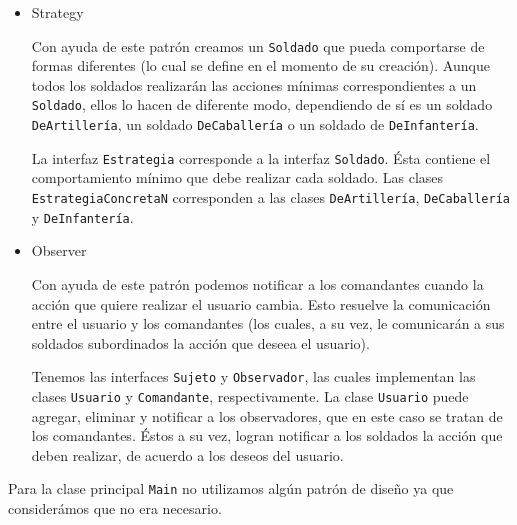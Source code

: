 \documentclass[letterpaper,11pt]{article}
\begin{document}
\begin{enumerate}
\begin{itemize}
        \item Strategy 

        Con ayuda de este patrón creamos un \texttt{Soldado} que pueda 
        comportarse de formas diferentes (lo cual se define en el momento 
        de su creación). Aunque todos los soldados realizarán las acciones 
        mínimas correspondientes a un \texttt{Soldado}, ellos lo hacen de 
        diferente modo, dependiendo de sí es un soldado \texttt{DeArtillería}, 
        un soldado \texttt{DeCaballería} o un soldado de \texttt{DeInfantería}.

        La interfaz \texttt{Estrategia} corresponde a la interfaz 
        \texttt{Soldado}. Ésta contiene el comportamiento mínimo que debe 
        realizar cada soldado. Las clases \texttt{EstrategiaConcretaN}
        corresponden a las clases \texttt{DeArtillería}, \texttt{DeCaballería}
        y \texttt{DeInfantería}. 

        \item Observer

        Con ayuda de este patrón podemos notificar a los comandantes cuando 
        la acción que quiere realizar el usuario cambia. Esto resuelve la 
        comunicación entre el usuario y los comandantes (los cuales, a su vez,
        le comunicarán a sus soldados subordinados la acción que deseea el 
        usuario).

        Tenemos las interfaces \texttt{Sujeto} y \texttt{Observador}, las cuales 
        implementan las clases \texttt{Usuario} y \texttt{Comandante}, 
        respectivamente. La clase \texttt{Usuario} puede agregar, eliminar y 
        notificar a los observadores, que en este caso se tratan de los 
        comandantes. Éstos a su vez, logran notificar a los soldados la acción 
        que deben realizar, de acuerdo a los deseos del usuario.
    \end{itemize}

    Para la clase principal \texttt{Main} no utilizamos algún patrón de diseño 
    ya que considerámos que no era necesario.
\end{enumerate}
\end{document}
